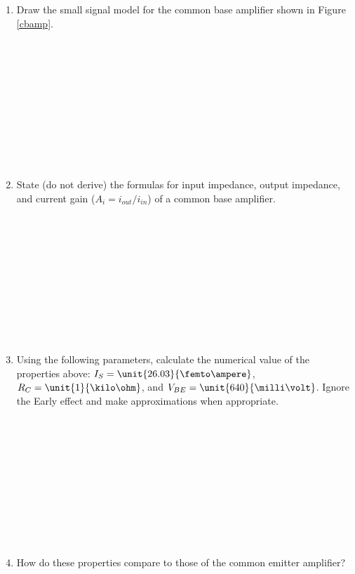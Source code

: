 \documentclass{article}
\begin{document}
\begin{enumerate}
	\item Draw the small signal model for the common base amplifier shown in Figure \ref{cbamp}. 
	~\\~\\~\\~\\~\\~\\~\\~\\~\\~\\~\\
	\item State (do not derive) the formulas for input impedance, output impedance, and current gain ($A_i = i_{out}/i_{in}$) of a common base amplifier.
	~\\~\\~\\~\\~\\~\\~\\~\\~\\~\\~\\
	\item Using the following parameters, calculate the numerical value of the properties above: $I_S = \unit{26.03}{\femto\ampere}$, $R_{C} = \unit{1}{\kilo\ohm}$, and $V_{BE} = \unit{640}{\milli\volt}$. Ignore the Early effect and make approximations when appropriate.
	~\\~\\~\\~\\~\\~\\~\\~\\~\\~\\~\\
	\item How do these properties compare to those of the common emitter amplifier?
	~\\~\\~\\~\\~\\~\\~\\~\\~\\~\\~\\

\end{enumerate}
\end{document}
